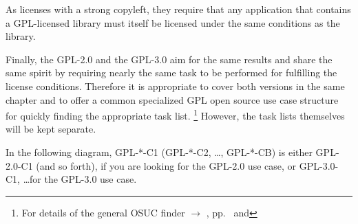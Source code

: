 As licenses with a strong copyleft, they require that any application that
contains a GPL-licensed library must itself be licensed under the same
conditions as the library.
 
Finally, the GPL-2.0 and the GPL-3.0 aim for the same results and share the
same spirit by requiring nearly the same task to be performed for fulfilling the
license conditions.  Therefore it is appropriate to cover both versions in the
same chapter and to offer a common specialized GPL open source use case
structure for quickly finding the appropriate task list.%
  \footnote{For details of the general OSUC finder $\rightarrow$ \oslic,
    pp.\ \pageref{OsucTokens} and \pageref{OsucDefinitionTree}}
However, the task lists themselves will be kept separate.

In the following diagram, GPL-*-C1 (GPL-*-C2, \ldots, GPL-*-CB) is either
GPL-2.0-C1 (and so forth), if you are looking for the GPL-2.0 use case, or
GPL-3.0-C1, \ldots for the GPL-3.0 use case.




\newcommand{\useCaseOne}{%
  \gtbUseCaseOne{GPL-\ver}
  \gtbCoversOne{GPL-\ver}}

\newcommand{\useCaseTwo}{%
  \gtbUseCaseTwo{GPL-\ver}
  \gtbCoversTwo{GPL-\ver}}

\newcommand{\useCaseThree}{%
  \gtbUseCaseThree{GPL-\ver}
  \gtbCoversThree{GPL-\ver}}

\newcommand{\useCaseFour}{%
  \gtbUseCaseFour{GPL-\ver}{a}
  \gtbCoversFour{GPL-\ver}}

\newcommand{\useCaseFive}{%
  \gtbUseCaseFive{GPL-\ver}{a}
  \gtbCoversFive{GPL-\ver}}

\newcommand{\useCaseSix}{%
  \gtbUseCaseSix{GPL-\ver}{a}
  \gtbCoversSix{GPL-\ver}}

\newcommand{\useCaseSeven}{%
  \gtbUseCaseSeven{GPL-\ver}{a}
  \gtbCoversSeven{GPL-\ver}}

\newcommand{\useCaseEight}{%
  \gtbUseCaseEight{GPL-\ver}{a}
  \gtbCoversEight{GPL-\ver}}

\newcommand{\useCaseNine}{%
  \gtbUseCaseNine{GPL-\ver}{a}
  \gtbCoversNine{GPL-\ver}}

\newcommand{\useCaseA}{%
  \gtbUseCaseA{GPL-\ver}{a}
  \gtbCoversA{GPL-\ver}}

